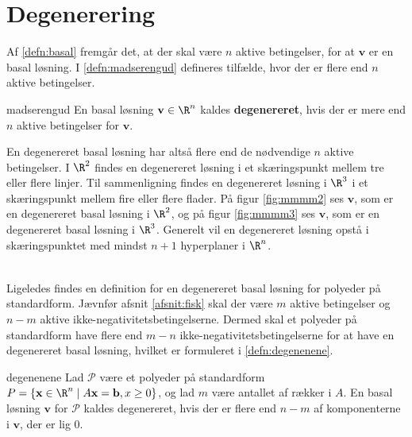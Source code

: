 \section{Degenerering}
Af \ref{defn:basal} fremgår det, at der skal være $n$ aktive betingelser, for at $\mathbf{v}$ er en basal løsning. 
I \ref{defn:madserengud} defineres tilfælde, hvor der er flere end $n$ aktive betingelser. 
%
\begin{defn}{}{madserengud}
En basal løsning $\mathbf{v} \in \R^n$ kaldes \textbf{degenereret}, hvis der er mere end $n$ aktive betingelser for $\mathbf{v}$.
\end{defn}
\noindent
%
En degenereret basal løsning har altså flere end de nødvendige $n$ aktive betingelser.
% 
I $\R^2$ findes en degenereret løsning i et skæringspunkt mellem tre eller flere linjer. 
Til sammenligning findes en degenereret løsning i $\R^3$ i et skæringspunkt mellem fire eller flere flader. 
På figur \ref{fig:mmmm2} ses $\mathbf{v}$, som er en degenereret basal løsning i $\R^2$, og på figur  \ref{fig:mmmm3} ses $\mathbf{v}$, som er en degenereret basal løsning i $\R^3$.
Generelt vil en degenereret løsning opstå i skæringspunktet med mindst $n+1$ hyperplaner i $\R^n$.
%
%
\begin{center}
$
\begin{array}{cc}
&

\end{array}
$
\end{center}
%
%
Ligeledes findes en definition for en degenereret basal løsning for polyeder på standardform. 
Jævnfør afsnit \ref{afsnit:fisk} skal der være $m$ aktive betingelser og $n-m$ aktive ikke-negativitetsbetingelserne. 
Dermed skal et polyeder på standardform have flere end $m-n$ ikke-negativitetsbetingelserne for at have en degenereret basal løsning, hvilket er formuleret i \ref{defn:degenenene}. 
%
\begin{defn}{}{degenenene}
Lad $\mathcal{P}$ være et polyeder på standardform
$P=\{ \mathbf{x} \in \R^n \mid A \mathbf{x}=\mathbf{b},x \geq 0 \}$, og lad $m$ være antallet af rækker i $A$.
En basal løsning $\mathbf{v}$ for $\mathcal{P}$ kaldes degenereret, hvis der er flere end $n-m$ af komponenterne i $\mathbf{v}$, der er lig $0$.
\end{defn}
%
